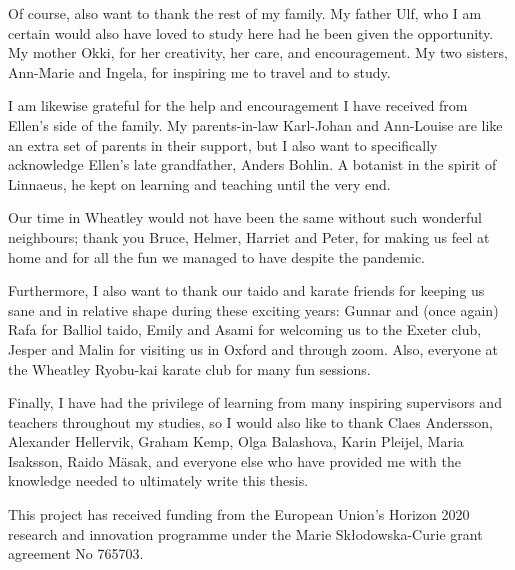 Of course, also want to thank the rest of my family. My father Ulf, who I am certain would also have loved to study here had he been given the opportunity. My mother Okki, for her creativity, her care, and encouragement. My two sisters, Ann-Marie and Ingela, for inspiring me to travel and to study.

I am likewise grateful for the help and encouragement I have received from Ellen's side of the family. My parents-in-law Karl-Johan and Ann-Louise are like an extra set of parents in their support, but I also want to specifically acknowledge Ellen's late grandfather, Anders Bohlin. A botanist in the spirit of Linnaeus, he kept on learning and teaching until the very end.

Our time in Wheatley would not have been the same without such wonderful neighbours; thank you Bruce, Helmer, Harriet and Peter, for making us feel at home and for all the fun we managed to have despite the pandemic.

Furthermore, I also want to thank our taido and karate friends for keeping us sane and in relative shape during these exciting years: Gunnar and (once again) Rafa for Balliol taido, Emily and Asami for welcoming us to the Exeter club, Jesper and Malin for visiting us in Oxford and through zoom. Also, everyone at the Wheatley Ryobu-kai karate club for many fun sessions.

Finally, I have had the privilege of learning from many inspiring supervisors and teachers throughout my studies, so I would also like to thank Claes Andersson, Alexander Hellervik, Graham Kemp, Olga Balashova, Karin Pleijel, Maria Isaksson, Raido Mäsak, and everyone else who have provided me with the knowledge needed to ultimately write this thesis.




This project has received funding from the European Union's Horizon 2020 research and innovation programme under the Marie Skłodowska-Curie grant agreement No 765703.
